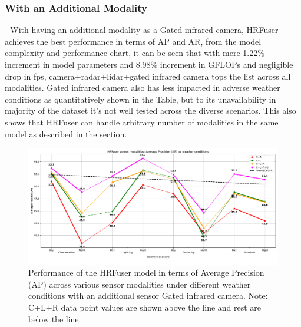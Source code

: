 \documentclass[report.tex]{subfiles}
\begin{document}
    \subsubsection{With an Additional Modality}
    
    - With having an additional modality as a Gated infrared camera, HRFuser achieves the best performance in terms of AP and AR, from the model complexity and performance chart, it can be seen that with mere 1.22\% increment in model parameters and 8.98\% increment in GFLOPs and negligible drop in fps, camera+radar+lidar+gated infrared camera tops the list across all modalities. Gated infrared camera also has less impacted in adverse weather conditions as quantitatively shown in the Table, but to its unavailability in majority of the dataset it's not well tested across the diverse scenarios. This also shows that HRFuser can handle arbitrary number of modalities in the same model as described in the section.

    \begin{figure}[]
        \centering
        \includegraphics[width=1.0\textwidth]{images/results/hrfuser/additional_modality/ap_2.pdf}
        \caption{Performance of the HRFuser model in terms of Average Precision (AP) across various sensor modalities under different weather conditions with an additional sensor Gated infrared camera. Note: C+L+R data point values are shown above the line and rest are below the line.}
        \label{fig:hrfuser_ap_2}
    \end{figure}
\end{document}
